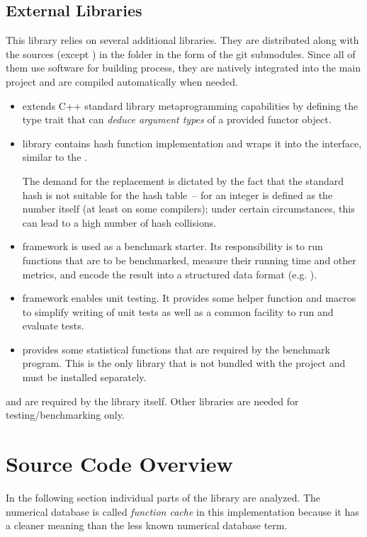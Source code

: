 \subsection{External Libraries}
This library relies on several additional libraries. They are distributed along with the sources (except ) in the  folder in the form of the git submodules. Since all of them use  software for building process, they are natively integrated into the main project and are compiled automatically when needed.
\begin{itemize}[leftmargin=2cm]
\item [\libname{function\_traits}] extends C++ standard library metaprogramming capabilities by defining the type trait that can \emph{deduce argument types} of a provided functor object.
\item [\libname{murmurhash2functor}] library contains  hash function\cite{murmurhash} implementation and wraps it into the interface, similar to the .

         The demand for the  replacement is dictated by the fact that the standard hash is not suitable for the hash table~--  for an integer is defined as the number itself (at least on some compilers\cite{std_hash}); under certain circumstances, this can lead to a high number of hash collisions.
\item [\libname{Google Benchmark}] framework is used as a benchmark starter. Its responsibility is to run functions that are to be benchmarked, measure their running time and other metrics, and encode the result into a structured data format (e.g. ).
\item [\libname{Google Test}] framework enables unit testing. It provides some helper function and macros to simplify writing of unit tests as well as a common facility to run and evaluate tests.
\item [\libname{Boost.Math}] provides some statistical functions that are required by the benchmark program. This is the only library that is not bundled with the project and must be installed separately.
\end{itemize}
 and  are required by the library itself. Other libraries are needed for testing/benchmarking only.

\section{Source Code Overview}
In the following section individual parts of the library are analyzed. The numerical database is called \emph{function cache} in this implementation because it has a cleaner meaning than the less known numerical database term.

